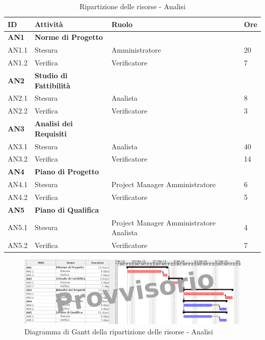 \documentclass[12pt,a4paper]{article}
\begin{document}
\begin{table}
\begin{center}
\begin{tabular}{p{} p{} p{} p{}}
\toprule
\textbf{ID}	&	\textbf{Attività}	&	\textbf{Ruolo}	&	\textbf{Ore}\\
\midrule
\midrule
\textbf{AN1} & \textbf{Norme di Progetto} &  &  \\
\midrule
AN1.1 & Stesura & Amministratore & 20 \\
\midrule
AN1.2 & Verifica & Verificatore & 7 \\
\midrule
\textbf{AN2} & \textbf{Studio di Fattibilità} & & \\
\midrule
AN2.1 & Stesura & Analista & 8 \\
\midrule
AN2.2 & Verifica & Verificatore & 3 \\
\midrule
\textbf{AN3} & \textbf{Analisi dei Requisiti} & &  \\
\midrule
AN3.1 & Stesura & Analista & 40 \\
\midrule
AN3.2 & Verifica & Verificatore & 14 \\
\midrule
\textbf{AN4} & \textbf{Piano di Progetto} & &  \\
\midrule
AN4.1 & Stesura & Project Manager \newline Amministratore & 6 \newline 10 \\
\midrule
AN4.2 & Verifica & Verificatore & 5 \\
\midrule
\textbf{AN5} & \textbf{Piano di Qualifica} & & \\
\midrule
AN5.1 & Stesura & Project Manager \newline Amministratore \newline Analista & 4 \newline 8 \newline 8 \\
\midrule
AN5.2 & Verifica & Verificatore & 7 \\
\bottomrule
\end{tabular}
\caption{Ripartizione delle risorse - Analisi}
\end{center}
\end{table}

\begin{center}
\begin{figure}
\centering
\includegraphics[width=\textwidth]{diagrammaGanttAnalisi.png}
\caption{Diagramma di Gantt della ripartizione delle risorse - Analisi}
\end{figure}
\end{center}
\end{document}
